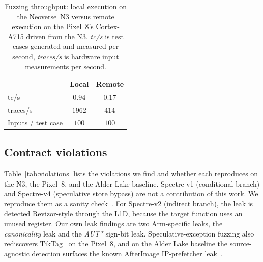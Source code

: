 \documentclass[letterpaper,twocolumn,10pt]{article}
\theoremstyle{definition}
\begin{document}
\begin{table}[t]\centering\small
\setlength{\tabcolsep}{6pt}
\caption{Fuzzing throughput: local execution on the Neoverse~N3 versus remote execution on the
Pixel~8's Cortex-A715 driven from the N3. \emph{tc/s} is test cases generated and measured per
second, \emph{traces/s} is hardware input measurements per second.}
\label{tab:throughput}
\begin{tabular}{@{}lcc@{}}
\toprule
 & Local & Remote \\
\midrule
tc/s               & $0.94$  & $0.17$ \\
traces/s           & $1962$  & $414$ \\
Inputs / test case & $100$   & $100$ \\
\bottomrule
\end{tabular}
\end{table}

\subsection{Contract violations}
\label{sec:eval-violations}
Table~\ref{tab:violations} lists the violations we find and whether each
reproduces on the N3, the Pixel~8, and the Alder Lake baseline. Spectre-v1 (conditional branch) and Spectre-v4 (speculative store bypass) are not a
contribution of this work. We reproduce them as a sanity check~\cite{revizor}. For Spectre-v2
(indirect branch), the leak is detected Revizor-style through the L1D, because the
target function uses an unused register. Our own leak findings are two Arm-specific leaks, the
\emph{canonicality} leak and the \emph{AUT*} sign-bit leak. Speculative-exception fuzzing also
rediscovers TikTag~\cite{tiktag} on the Pixel~8, and on the Alder Lake baseline the
source-agnostic detection surfaces the known AfterImage IP-prefetcher leak~\cite{afterimage}.
\end{document}

